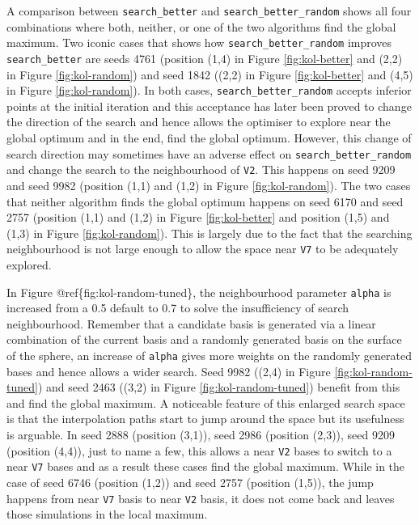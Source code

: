 \documentclass[12pt]{article}
\begin{document}
A comparison between \texttt{search\_better} and \texttt{search\_better\_random} shows all four combinations where both, neither, or one of the two algorithms find the global maximum. Two iconic cases that shows how \texttt{search\_better\_random} improves \texttt{search\_better} are seeds 4761 (position (1,4) in Figure \ref{fig:kol-better} and (2,2) in Figure \ref{fig:kol-random}) and seed 1842 ((2,2) in Figure \ref{fig:kol-better} and (4,5) in Figure \ref{fig:kol-random}). In both cases, \texttt{search\_better\_random} accepts inferior points at the initial iteration and this acceptance has later been proved to change the direction of the search and hence allows the optimiser to explore near the global optimum and in the end, find the global optimum. However, this change of search direction may sometimes have an adverse effect on \texttt{search\_better\_random} and change the search to the neighbourhood of \texttt{V2}. This happens on seed 9209 and seed 9982 (position (1,1) and (1,2) in Figure \ref{fig:kol-random}). The two cases that neither algorithm finds the global optimum happens on seed 6170 and seed 2757 (position (1,1) and (1,2) in Figure \ref{fig:kol-better} and position (1,5) and (1,3) in Figure \ref{fig:kol-random}). This is largely due to the fact that the searching neighbourhood is not large enough to allow the space near \texttt{V7} to be adequately explored.

In Figure @ref\{fig:kol-random-tuned\}, the neighbourhood parameter \texttt{alpha} is increased from a 0.5 default to 0.7 to solve the insufficiency of search neighbourhood. Remember that a candidate basis is generated via a linear combination of the current basis and a randomly generated basis on the surface of the sphere, an increase of \texttt{alpha} gives more weights on the randomly generated bases and hence allows a wider search. Seed 9982 ((2,4) in Figure \ref{fig:kol-random-tuned}) and seed 2463 ((3,2) in Figure \ref{fig:kol-random-tuned}) benefit from this and find the global maximum. A noticeable feature of this enlarged search space is that the interpolation paths start to jump around the space but its usefulness is arguable. In seed 2888 (position (3,1)), seed 2986 (position (2,3)), seed 9209 (position (4,4)), just to name a few, this allows a near \texttt{V2} bases to switch to a near \texttt{V7} bases and as a result these cases find the global maximum. While in the case of seed 6746 (position (1,2)) and seed 2757 (position (1,5)), the jump happens from near \texttt{V7} basis to near \texttt{V2} basis, it does not come back and leaves those simulations in the local maximum.
\end{document}
